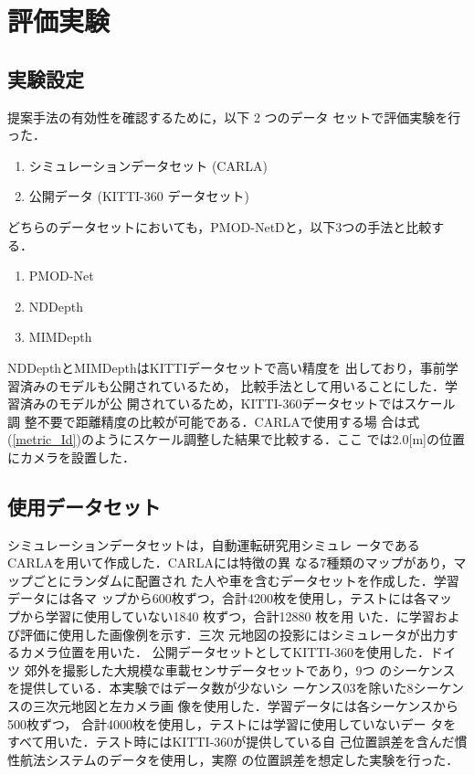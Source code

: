 \section{評価実験}
\subsection{実験設定}
提案手法の有効性を確認するために，以下 2 つのデータ
セットで評価実験を行った．
\begin{enumerate}[1.]
  \item シミュレーションデータセット (CARLA\cite{13})
  \item 公開データ (KITTI-360 データセット\cite{14})
\end{enumerate}

どちらのデータセットにおいても，PMOD-NetDと，以下3つの手法と比較する．
\begin{enumerate}[1.]
  \item PMOD-Net\cite{3}
  \item NDDepth\cite{1}
  \item MIMDepth\cite{2}
\end{enumerate}

NDDepthとMIMDepthはKITTIデータセットで高い精度を
出しており，事前学習済みのモデルも公開されているため，
比較手法として用いることにした．学習済みのモデルが公
開されているため，KITTI-360データセットではスケール調
整不要で距離精度の比較が可能である．CARLAで使用する場
合は式(\ref{metric_Id})のようにスケール調整した結果で比較する．ここ
では2.0[m]の位置にカメラを設置した．
\subsection{使用データセット}
シミュレーションデータセットは，自動運転研究用シミュレ
ータである CARLA\cite{13}を用いて作成した．CARLAには特徴の異
なる7種類のマップがあり，マップごとにランダムに配置され
た人や車を含むデータセットを作成した．学習データには各マ
ップから600枚ずつ，合計4200枚を使用し，テストには各マッ
プから学習に使用していない1840 枚ずつ，合計12880 枚を用
いた．に学習および評価に使用した画像例を示す．三次
元地図の投影にはシミュレータが出力するカメラ位置を用いた．
公開データセットとしてKITTI-360\cite{14}を使用した．ドイツ
郊外を撮影した大規模な車載センサデータセットであり，9つ
のシーケンスを提供している．本実験ではデータ数が少ないシ
ーケンス03を除いた8シーケンスの三次元地図と左カメラ画
像を使用した．学習データには各シーケンスから500枚ずつ，
合計4000枚を使用し，テストには学習に使用していないデー
タをすべて用いた．テスト時にはKITTI-360が提供している自
己位置誤差を含んだ慣性航法システムのデータを使用し，実際
の位置誤差を想定した実験を行った．

